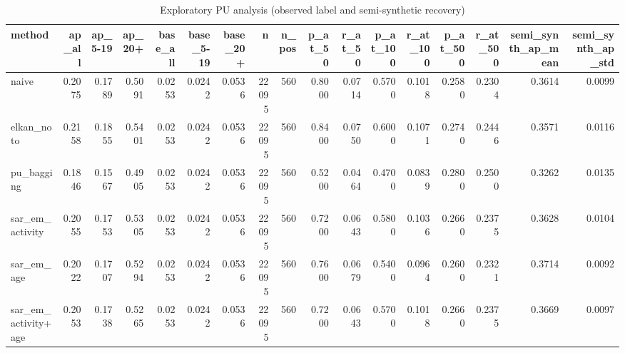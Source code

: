\begin{table}
\caption{Exploratory PU analysis (observed label and semi-synthetic recovery)}
\label{tab:tab_pu_methods}
\begin{tabular}{lrrrrrrrrrrrrrrrr}
\toprule
method & ap\_all & ap\_5-19 & ap\_20+ & base\_all & base\_5-19 & base\_20+ & n & n\_pos & p\_at\_50 & r\_at\_50 & p\_at\_100 & r\_at\_100 & p\_at\_500 & r\_at\_500 & semi\_synth\_ap\_mean & semi\_synth\_ap\_std \\
\midrule
naive & 0.2075 & 0.1789 & 0.5091 & 0.0253 & 0.0242 & 0.0536 & 22095 & 560 & 0.8000 & 0.0714 & 0.5700 & 0.1018 & 0.2580 & 0.2304 & 0.3614 & 0.0099 \\
elkan\_noto & 0.2158 & 0.1855 & 0.5401 & 0.0253 & 0.0242 & 0.0536 & 22095 & 560 & 0.8400 & 0.0750 & 0.6000 & 0.1071 & 0.2740 & 0.2446 & 0.3571 & 0.0116 \\
pu\_bagging & 0.1846 & 0.1567 & 0.4905 & 0.0253 & 0.0242 & 0.0536 & 22095 & 560 & 0.5200 & 0.0464 & 0.4700 & 0.0839 & 0.2800 & 0.2500 & 0.3262 & 0.0135 \\
sar\_em\_activity & 0.2055 & 0.1753 & 0.5305 & 0.0253 & 0.0242 & 0.0536 & 22095 & 560 & 0.7200 & 0.0643 & 0.5800 & 0.1036 & 0.2660 & 0.2375 & 0.3628 & 0.0104 \\
sar\_em\_age & 0.2022 & 0.1707 & 0.5294 & 0.0253 & 0.0242 & 0.0536 & 22095 & 560 & 0.7600 & 0.0679 & 0.5400 & 0.0964 & 0.2600 & 0.2321 & 0.3714 & 0.0092 \\
sar\_em\_activity+age & 0.2053 & 0.1738 & 0.5265 & 0.0253 & 0.0242 & 0.0536 & 22095 & 560 & 0.7200 & 0.0643 & 0.5700 & 0.1018 & 0.2660 & 0.2375 & 0.3669 & 0.0097 \\
\bottomrule
\end{tabular}
\end{table}
